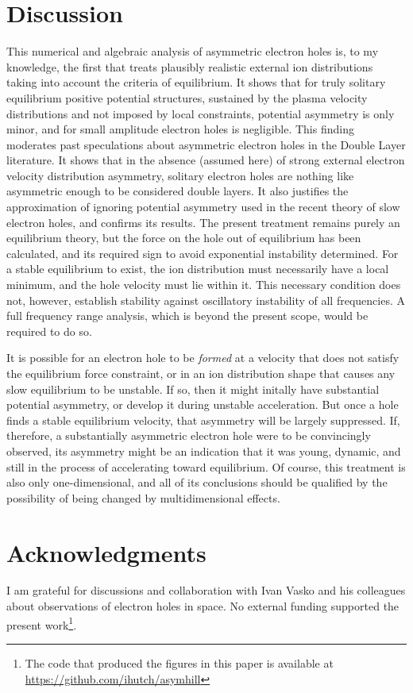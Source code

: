 \documentclass[pre]{revtex4-2}
\begin{document}
\section{Discussion}

This numerical and algebraic analysis of asymmetric electron holes is,
to my knowledge, the first that treats plausibly realistic external
ion distributions taking into account the criteria of equilibrium. It
shows that for truly solitary equilibrium positive potential
structures, sustained by the plasma velocity distributions and not
imposed by local constraints, potential asymmetry is only minor, and
for small amplitude electron holes is negligible.  This finding
moderates past speculations about asymmetric electron holes in the
Double Layer literature. It shows that in the absence (assumed here)
of strong external electron velocity distribution asymmetry, solitary
electron holes are nothing like asymmetric enough to be considered
double layers. It also justifies the approximation of ignoring
potential asymmetry used in the recent theory\cite{Hutchinson2021c} of
slow electron holes, and confirms its results. The present treatment
remains purely an equilibrium theory, but the force on the hole out of
equilibrium has been calculated, and its required sign to avoid
exponential instability determined. For a stable equilibrium to exist,
the ion distribution must necessarily have a local minimum, and the
hole velocity must lie within it. This necessary condition does not,
however, establish stability against oscillatory instability of all
frequencies. A full frequency range analysis, which is beyond the
present scope, would be required to do so.

It is possible for an electron hole to be \emph{formed} at a velocity
that does not satisfy the equilibrium force constraint, or in an ion
distribution shape that causes any slow equilibrium to be unstable. If
so, then it might initally have substantial potential asymmetry, or
develop it during unstable acceleration. But once a hole finds a stable
equilibrium velocity, that asymmetry will be largely suppressed. If,
therefore, a substantially asymmetric electron hole were to be
convincingly observed, its asymmetry might be an indication that it
was young, dynamic, and still in the process of accelerating toward
equilibrium. Of course, this treatment is also only one-dimensional,
and all of its conclusions should be qualified by the possibility of
being changed by multidimensional effects.

\section*{Acknowledgments}
I am grateful for discussions and collaboration with Ivan Vasko and
his colleagues about observations of electron holes in space. No
external funding supported the present work\footnote{The code that
  produced the figures in this paper is available at
  \url{https://github.com/ihutch/asymhill}}.


\end{document}
